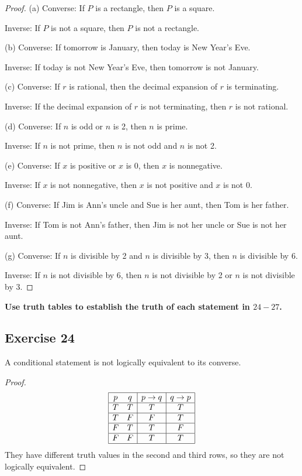 \documentclass[14pt]{extarticle}
\begin{document}
\begin{proof} 
(a) Converse: If $P$ is a rectangle, then $P$ is a square.

Inverse: If $P$ is not a square, then $P$ is not a rectangle.

(b) Converse: If tomorrow is January, then today is New Year’s Eve.

Inverse: If today is not New Year’s Eve, then tomorrow is not January.

(c) Converse: If $r$ is rational, then the decimal expansion of $r$ is terminating.

Inverse: If the decimal expansion of $r$ is not terminating, then $r$ is not rational.

(d) Converse: If $n$ is odd or $n$ is 2, then $n$ is prime.

Inverse: If $n$ is not prime, then $n$ is not odd and $n$ is not 2.	

(e) Converse: If $x$ is positive or $x$ is 0, then $x$ is nonnegative.

Inverse: If $x$ is not nonnegative, then $x$ is not positive and $x$ is not 0.

(f) Converse: If Jim is Ann’s uncle and Sue is her aunt, then Tom is her father.

Inverse: If Tom is not Ann’s father, then Jim is not her uncle or Sue is not her aunt.

(g) Converse: If $n$ is divisible by 2 and $n$ is divisible by 3, then $n$ is divisible by 6.

Inverse: If $n$ is not divisible by 6, then $n$ is not divisible by 2 or $n$ is not divisible by 3. 
\end{proof}

{\bf Use truth tables to establish the truth of each statement in $24-27$.}

\subsection{Exercise 24} 
A conditional statement is not logically equivalent to its converse.

\begin{proof} 
$$ 
\begin{array}{|cc|c|c|} 
\hline 
p & q & p \to q & q \to p \\
\hline 
T & T & T & T \\ 
\hline 
T & F & F & T \\ 
\hline 
F & T & T & F \\ 
\hline 
F & F & T & T \\ 
\hline 
\end{array} 
$$ 
They have different truth values in the second and third rows, so they are not logically equivalent. 
\end{proof}
\end{document}
